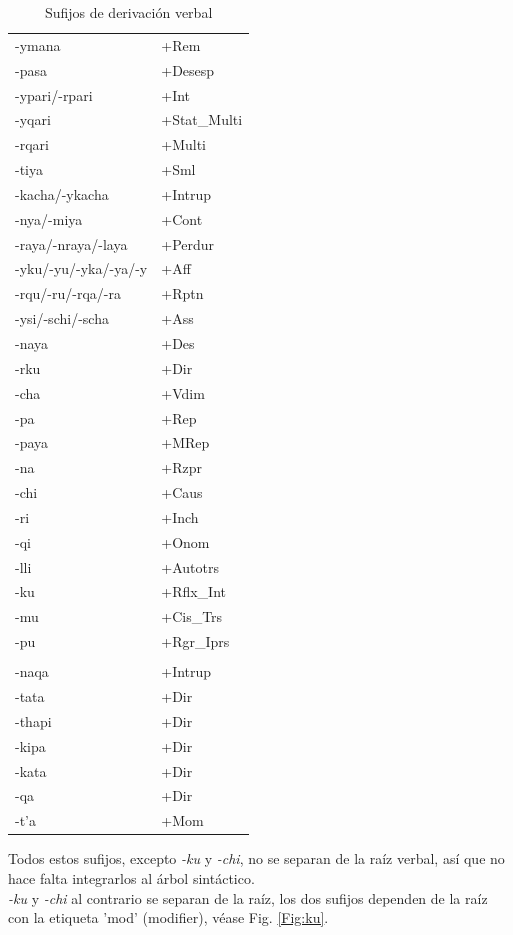 \documentclass[a4paper,11pt,DIV12]{scrartcl}
\begin{document}
\begin{table}
\caption{Sufijos de derivaci\'on verbal}\label{Tab:VDeriv}
\begin{center}
\begin{tabular}{ll}
\toprule
-ymana & +Rem\\
-pasa  & +Desesp\\
-ypari/-rpari & +Int\\
-yqari & +Stat\_Multi\\
-rqari & +Multi\\
-tiya & +Sml\\
-kacha/-ykacha & +Intrup\\
-nya/-miya & +Cont\\
-raya/-nraya/-laya & +Perdur\\
-yku/-yu/-yka/-ya/-y & +Aff\\
-rqu/-ru/-rqa/-ra & +Rptn\\
-ysi/-schi/-scha & +Ass\\
-naya & +Des \\
-rku & +Dir\\
-cha & +Vdim\\
-pa & +Rep\\
-paya & +MRep\\
-na & +Rzpr\\
-chi & +Caus\\
-ri & +Inch\\
-qi & +Onom\\
-lli & +Autotrs\\
-ku & +Rflx\_Int\\
-mu & +Cis\_Trs\\
-pu & +Rgr\_Iprs\\ \addlinespace
\multicolumn{2}{l}{pr\'estamos del Aymara:}\\
-naqa & +Intrup\\
-tata & +Dir\\
-thapi & +Dir \\
-kipa & +Dir \\
-kata & +Dir\\
-qa & +Dir\\
-t'a & +Mom\\

\bottomrule
\end{tabular}
\end{center}
\end{table}


Todos estos sufijos, excepto \textit{-ku} y {\em -chi}, no se separan de la ra\'iz verbal, as\'i que no hace falta integrarlos al \'arbol sint\'actico. \\
{\em -ku} y {\em -chi} al contrario se separan de la ra\'iz, los dos sufijos dependen de la ra\'iz con la etiqueta 'mod' (modifier), v\'ease Fig. \ref{Fig:ku}.
\end{document}
